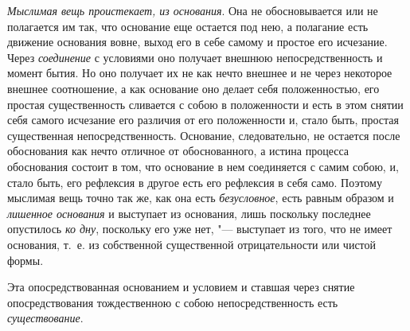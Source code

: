 {\em Мыслимая вещь проистекает, из основания}. Она не
обосновывается или не полагается им так, что основание еще остается под
нею, а полагание есть движение основания вовне, выход его в себе самому и
простое его исчезание. Через {\em соединение} с
условиями оно получает внешнюю непосредственность и момент бытия. Но оно
получает их не как нечто внешнее и не через некоторое внешнее соотношение,
а как основание оно делает себя положенностью, его простая существенность
сливается с собою в положенности и есть в этом снятии себя самого исчезание
его различия от его положенности и, стало быть, простая существенная
непосредственность. Основание, следовательно, не остается после обоснования
как нечто отличное от обоснованного, а истина процесса обоснования состоит
в том, что основание в нем соединяется с самим собою, и, стало быть, его
рефлексия в другое есть его рефлексия в себя само. Поэтому мыслимая вещь
точно так же, как она есть {\em безусловное}, есть
равным образом и {\em лишенное основания} и выступает
из основания, лишь поскольку последнее опустилось
{\em ко дну}, поскольку его уже нет, "--- выступает из
того, что не имеет основания, т.~е. из собственной существенной
отрицательности или чистой формы.

Эта опосредствованная основанием и условием и ставшая через снятие
опосредствования тождественною с собою непосредственность есть
{\em существование}.


\bigskip


